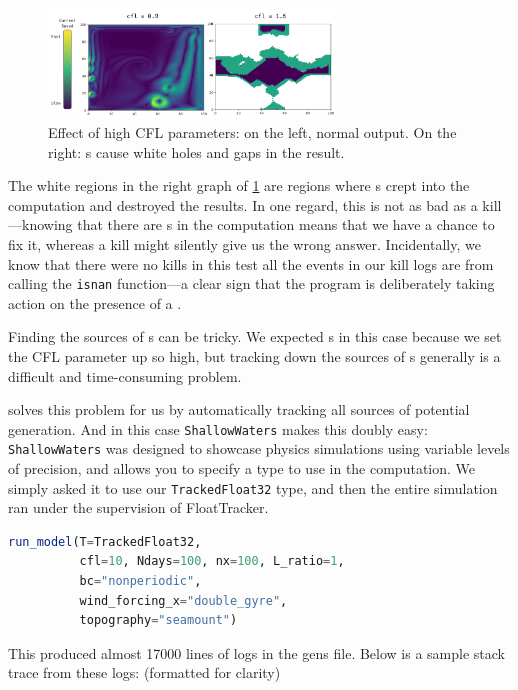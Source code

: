 \documentclass{juliacon}
\begin{document}
\begin{figure}[t]
  \centering
  \includegraphics[width=3in]{./fig/shallow_waters_cfl_diff.png}
  \caption{Effect of high CFL parameters: on the left, normal output. On the right: \NaN{}s cause white holes and gaps in the result.}
  \label{fig:sw_nans}
\end{figure}

The white regions in the right graph of \cref{fig:sw_nans} are regions where \NaN{}s crept into the computation and destroyed the results.
In one regard, this is not as bad as a \NaN{} kill---knowing that there are \NaN{}s in the computation means that we have a chance to fix it, whereas a \NaN{} kill might silently give us the wrong answer.
Incidentally, we know that there were no \NaN{} kills in this test all the events in our kill logs are from calling the \texttt{isnan} function---a clear sign that the program is deliberately taking action on the presence of a \NaN{}.

Finding the sources of \NaN{}s can be tricky.
We expected \NaN{}s in this case because we set the CFL parameter up so high, but tracking down the sources of \NaN{}s generally is a difficult and time-consuming problem.

\FT{} solves this problem for us by automatically tracking all sources of potential \NaN{} generation.
And in this case \texttt{ShallowWaters} makes this doubly easy:
\texttt{ShallowWaters} was designed to showcase physics simulations using variable levels of \fp{} precision, and allows you to specify a \fp{} type to use in the computation.
We simply asked it to use our \texttt{TrackedFloat32} type, and then the entire simulation ran under the supervision of FloatTracker.

\begin{lstlisting}[language = Julia]
run_model(T=TrackedFloat32,
          cfl=10, Ndays=100, nx=100, L_ratio=1,
          bc="nonperiodic",
          wind_forcing_x="double_gyre",
          topography="seamount")
\end{lstlisting}

This produced almost 17000 lines of logs in the gens file. Below is a sample stack trace from these logs: (formatted for clarity)
\end{document}
